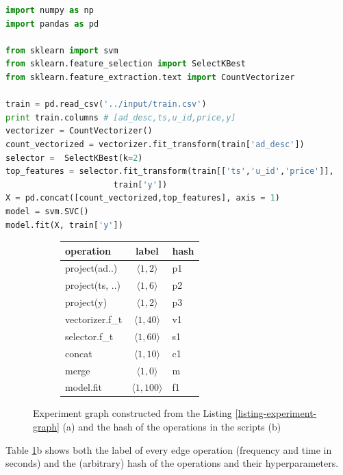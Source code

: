 \begin{lstlisting}[language=Python, caption=Example script,captionpos=b,label = {listing-experiment-graph}]
import numpy as np
import pandas as pd

from sklearn import svm
from sklearn.feature_selection import SelectKBest
from sklearn.feature_extraction.text import CountVectorizer

train = pd.read_csv('../input/train.csv') 
print train.columns # [ad_desc,ts,u_id,price,y]
vectorizer = CountVectorizer()
count_vectorized = vectorizer.fit_transform(train['ad_desc'])
selector =  SelectKBest(k=2)
top_features = selector.fit_transform(train[['ts','u_id','price']], 
				      train['y'])
X = pd.concat([count_vectorized,top_features], axis = 1)
model = svm.SVC()
model.fit(X, train['y'])
\end{lstlisting}

\begin{figure}
\begin{subfigure}[b]{0.4\linewidth}
\centering

\caption{}
\end{subfigure}%
\begin{subfigure}[b]{0.6\linewidth}
\begin{tabular}{lcl}
\hline
operation & label &  hash \\
\hline
project(ad..) & $\langle 1, 2\rangle$ &p1 \\
project(ts, ..) & $\langle 1, 6\rangle$ & p2\\
project(y) & $\langle 1, 2\rangle$ & p3\\
vectorizer.f\_t & $\langle 1, 40\rangle$ & v1 \\
selector.f\_t & $\langle 1, 60\rangle$ & s1 \\
concat & $\langle 1, 10\rangle$ & c1 \\
merge & $\langle 1, 0 \rangle$ & m\\
model.fit & $\langle 1, 100\rangle$ & f1\\

\end{tabular}
\caption{}
\end{subfigure}
\caption{Experiment graph constructed from the Listing \ref{listing-experiment-graph} (a) and the hash of the operations in the scripts (b)}
\label{fig-experiment-graph}
\end{figure}
Table \ref{fig-experiment-graph}b shows both the label of every edge operation (frequency and time in seconds) and the (arbitrary) hash of the operations and their hyperparameters.

